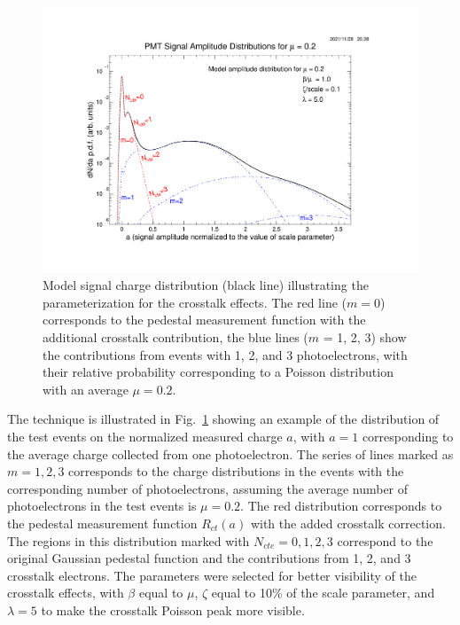 \begin{figure}[hbt]
	\centering
	\includegraphics[width=0.98\linewidth, trim=80 55 105 105, clip]{figures/model.pdf}
	\caption{Model  signal  charge  distribution  (black  line)  illustrating  the parameterization for the crosstalk effects. The red line ($m=0$) corresponds to the pedestal measurement function with the additional crosstalk contribution, the blue lines ($m$ = 1, 2, 3) show the contributions from events with 1, 2, and 3 photoelectrons, with their relative probability corresponding to a Poisson distribution with an average $\mu=0.2$.}
	\label{fig:Model}
\end{figure}


The technique is illustrated in Fig.~\ref{fig:Model} showing an example of the distribution of the test events on the normalized measured charge $a$, with $a=1$ corresponding to the average charge collected from one photoelectron. The series of lines marked as $m = 1, 2, 3$ corresponds to the charge distributions in the events with the corresponding number of photoelectrons, assuming the average number of photoelectrons in the test events is $\mu = 0.2$. The red distribution corresponds to the pedestal measurement function $R_{ct}(a)$ with the added crosstalk correction. The regions in this distribution marked with $N_{cte}=0, 1, 2, 3$ correspond to the original Gaussian pedestal function and the contributions from 1, 2, and 3 crosstalk electrons. The parameters were selected for better visibility of the crosstalk effects, with $\beta$ equal to $\mu$, $\zeta$ equal to 10\% of the scale parameter, and $\lambda = 5$ to make the crosstalk Poisson peak more visible.  

